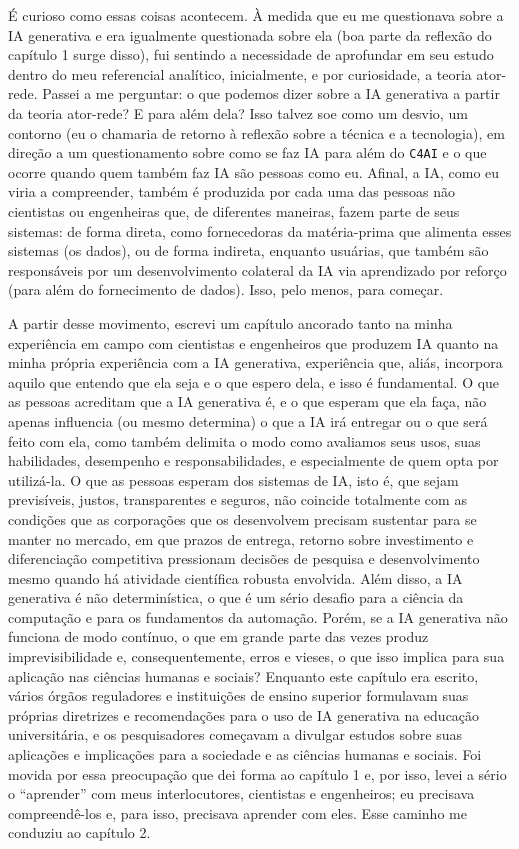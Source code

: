 É curioso como essas coisas acontecem. À medida que eu me questionava sobre a IA generativa e era igualmente questionada sobre ela (boa parte da reflexão do capítulo 1 surge disso), fui sentindo a necessidade de aprofundar em seu estudo dentro do meu referencial analítico, inicialmente, e por curiosidade, a teoria ator-rede. Passei a me perguntar: o que podemos dizer sobre a IA generativa a partir da teoria ator-rede? E para além dela? Isso talvez soe como um desvio, um contorno (eu o chamaria de retorno à reflexão sobre a técnica e a tecnologia), em direção a um questionamento sobre como se faz IA para além do \texttt{C4AI} e o que ocorre quando quem também faz IA são pessoas como eu. Afinal, a IA, como eu viria a compreender, também é produzida por cada uma das pessoas não cientistas ou engenheiras que, de diferentes maneiras, fazem parte de seus sistemas: de forma direta, como fornecedoras da matéria-prima que alimenta esses sistemas (os dados), ou de forma indireta, enquanto usuárias, que também são responsáveis por um desenvolvimento colateral da IA via aprendizado por reforço (para além do fornecimento de dados). Isso, pelo menos, para começar.

A partir desse movimento, escrevi um capítulo ancorado tanto na minha experiência em campo com cientistas e engenheiros que produzem IA quanto na minha própria experiência com a IA generativa, experiência que, aliás, incorpora aquilo que entendo que ela seja e o que espero dela, e isso é fundamental. O que as pessoas acreditam que a IA generativa é, e o que esperam que ela faça, não apenas influencia (ou mesmo determina) o que a IA irá entregar ou o que será feito com ela, como também delimita o modo como avaliamos seus usos, suas habilidades, desempenho e responsabilidades, e  especialmente de quem opta por utilizá-la. O que as pessoas esperam dos sistemas de IA, isto é, que sejam previsíveis, justos, transparentes e seguros, não coincide totalmente com as condições que as corporações que os desenvolvem precisam sustentar para se manter no mercado, em que prazos de entrega, retorno sobre investimento e diferenciação competitiva pressionam decisões de pesquisa e desenvolvimento mesmo quando há atividade científica robusta envolvida. Além disso, a IA generativa é não determinística, o que é um sério desafio para a ciência da computação e para os fundamentos da automação. Porém, se a IA generativa não funciona de modo contínuo, o que em grande parte das vezes produz imprevisibilidade e, consequentemente, erros e vieses, o que isso implica para sua aplicação nas ciências humanas e sociais? Enquanto este capítulo era escrito, vários órgãos reguladores e instituições de ensino superior formulavam suas próprias diretrizes e recomendações para o uso de IA generativa na educação universitária, e os pesquisadores começavam a divulgar estudos sobre suas aplicações e implicações para a sociedade e as ciências humanas e sociais. Foi movida por essa preocupação que dei forma ao capítulo 1 e, por isso, levei a sério o \enquote{aprender} com meus interlocutores, cientistas e engenheiros; eu precisava compreendê-los e, para isso, precisava aprender com eles. Esse caminho me conduziu ao capítulo 2. 

